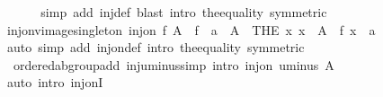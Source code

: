 \begin{isabellebody}
\ \ %
\isanewline
%
\isadelimproof
\ \ %
\endisadelimproof
%
\isatagproof
{}\isamarkupfalse%
\ {\isacharparenleft}{\kern0pt}simp\ add{\isacharcolon}{\kern0pt}\ inj{\isacharunderscore}{\kern0pt}def{\isacharparenright}{\kern0pt}\ {\isacharparenleft}{\kern0pt}blast\ intro{\isacharcolon}{\kern0pt}\ the{\isacharunderscore}{\kern0pt}equality\ {\isacharbrackleft}{\kern0pt}symmetric{\isacharbrackright}{\kern0pt}{\isacharparenright}{\kern0pt}%
\endisatagproof
{\isafoldproof}%
%
\isadelimproof
\isanewline
%
\endisadelimproof
\isanewline
{}\isamarkupfalse%
\ inj{\isacharunderscore}{\kern0pt}on{\isacharunderscore}{\kern0pt}vimage{\isacharunderscore}{\kern0pt}singleton{\isacharcolon}{\kern0pt}\ {\isachardoublequoteopen}inj{\isacharunderscore}{\kern0pt}on\ f\ A\ {\isasymLongrightarrow}\ f\ {\isacharminus}{\kern0pt}{\isacharbackquote}{\kern0pt}\ {\isacharbraceleft}{\kern0pt}a{\isacharbraceright}{\kern0pt}\ {\isasyminter}\ A\ {\isasymsubseteq}\ {\isacharbraceleft}{\kern0pt}THE\ x{\isachardot}{\kern0pt}\ x\ {\isasymin}\ A\ {\isasymand}\ f\ x\ {\isacharequal}{\kern0pt}\ a{\isacharbraceright}{\kern0pt}{\isachardoublequoteclose}\isanewline
%
\isadelimproof
\ \ %
\endisadelimproof
%
\isatagproof
{}\isamarkupfalse%
\ {\isacharparenleft}{\kern0pt}auto\ simp\ add{\isacharcolon}{\kern0pt}\ inj{\isacharunderscore}{\kern0pt}on{\isacharunderscore}{\kern0pt}def\ intro{\isacharcolon}{\kern0pt}\ the{\isacharunderscore}{\kern0pt}equality\ {\isacharbrackleft}{\kern0pt}symmetric{\isacharbrackright}{\kern0pt}{\isacharparenright}{\kern0pt}%
\endisatagproof
{\isafoldproof}%
%
\isadelimproof
\isanewline
%
\endisadelimproof
\isanewline
{}\isamarkupfalse%
\ {\isacharparenleft}{\kern0pt}\ ordered{\isacharunderscore}{\kern0pt}ab{\isacharunderscore}{\kern0pt}group{\isacharunderscore}{\kern0pt}add{\isacharparenright}{\kern0pt}\ inj{\isacharunderscore}{\kern0pt}uminus{\isacharbrackleft}{\kern0pt}simp{\isacharcomma}{\kern0pt}\ intro{\isacharbrackright}{\kern0pt}{\isacharcolon}{\kern0pt}\ {\isachardoublequoteopen}inj{\isacharunderscore}{\kern0pt}on\ uminus\ A{\isachardoublequoteclose}\isanewline
%
\isadelimproof
\ \ %
\endisadelimproof
%
\isatagproof
{}\isamarkupfalse%
\ {\isacharparenleft}{\kern0pt}auto\ intro{\isacharbang}{\kern0pt}{\isacharcolon}{\kern0pt}\ inj{\isacharunderscore}{\kern0pt}onI{\isacharparenright}{\kern0pt}%
\endisatagproof
{\isafoldproof}%
%
\isadelimproof
\isanewline
%
\endisadelimproof
\isanewline

\end{isabellebody}
